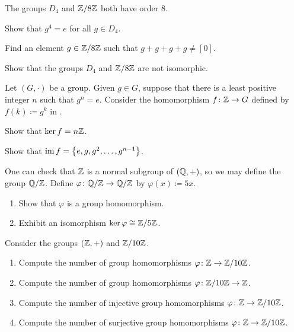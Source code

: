 \documentclass[../main.tex]{subfiles}
\begin{document}
\begin{homework}
    The groups $D_4$ and $\mathbb Z/8\mathbb Z$ both have order $8$.
    \begin{listalph}
        \item Show that $g^4=e$ for all $g\in D_4$.
        \item Find an element $g\in\mathbb Z/8\mathbb Z$ such that $g+g+g+g\ne[0]$.
        \item Show that the groups $D_4$ and $\mathbb Z/8\mathbb Z$ are not isomorphic.
    \end{listalph}
\end{homework}

\begin{homework}
    Let $(G,\cdot)$ be a group. Given $g\in G$, suppose that there is a least positive integer $n$ such that $g^n=e$. Consider the homomorphism $f\colon\mathbb Z\to G$ defined by $f(k)\coloneqq g^k$ in .
    \begin{listalph}
        \item Show that $\ker f=n\mathbb Z$.
        \item Show that $\operatorname{im} f=\left\{e,g,g^2,\ldots,g^{n-1}\right\}$.
    \end{listalph}
\end{homework}

\begin{homework}
    One can check that $\mathbb Z$ is a normal subgroup of $(\mathbb Q,+)$, so we may define the group $\mathbb Q/\mathbb Z$. Define $\varphi\colon\mathbb Q/\mathbb Z\to\mathbb Q/\mathbb Z$ by $\varphi(x)\coloneqq 5x$.
    \begin{enumerate}[label=(\alph*)]
        \item Show that $\varphi$ is a group homomorphism.
        \item Exhibit an isomorphism $\ker\varphi\cong\mathbb Z/5\mathbb Z$.
    \end{enumerate}
\end{homework}

\begin{homework}
    Consider the groups $(\mathbb Z,+)$ and $\mathbb Z/10\mathbb Z$.
    \begin{enumerate}[label=(\alph*)]
        \item Compute the number of group homomorphisms $\varphi\colon\mathbb Z\to\mathbb Z/10\mathbb Z$.
        \item Compute the number of group homomorphisms $\varphi\colon\mathbb Z/10\mathbb Z\to\mathbb Z$.
        \item Compute the number of injective group homomorphisms $\varphi\colon\mathbb Z\to\mathbb Z/10\mathbb Z$.
        \item Compute the number of surjective group homomorphisms $\varphi\colon\mathbb Z\to\mathbb Z/10\mathbb Z$.
    \end{enumerate}
\end{homework}
\end{document}
